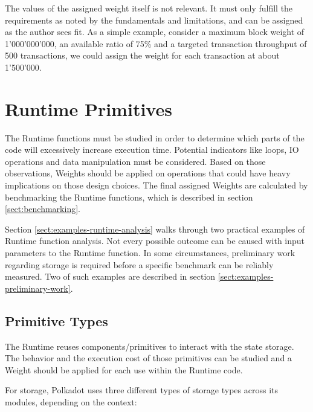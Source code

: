 \documentclass[11pt,a4paper]{article}
\begin{document}
The values of the assigned weight itself is not relevant. It must only fulfill the requirements
as noted by the fundamentals and limitations, and can be assigned as the author sees fit.
As a simple example, consider a maximum block weight of 1'000'000'000, an available ratio of
75\% and a targeted transaction throughput of 500 transactions, we could assign the weight
for each transaction at about 1'500'000.
\newline


\section{Runtime Primitives}
\label{sec:runtime-primitives}
The Runtime functions must be studied in order to determine which parts of the code will excessively
increase execution time. Potential indicators like loops, IO operations and data manipulation must
be considered. Based on those observations, Weights should be applied on operations
that could have heavy implications on those design choices. The final assigned Weights are calculated
by benchmarking the Runtime functions, which is described in section \ref{sect:benchmarking}.
\newline

Section \ref{sect:examples-runtime-analysis} walks through two practical examples of Runtime function
analysis.
Not every possible outcome can be caused with input parameters to the Runtime function.
In some circumstances, preliminary work regarding
storage is required before a specific benchmark can be reliably measured.
Two of such examples are described in section \ref{sect:examples-preliminary-work}.

\subsection{Primitive Types}\label{sect:primitive-types}
The Runtime reuses components/primitives to interact with the state storage. The behavior and
the execution cost of those primitives can be studied and a Weight should be applied for each use
within the Runtime code.
\newline

For storage, Polkadot uses three different types of storage types across its modules, depending on the
context:
\end{document}
